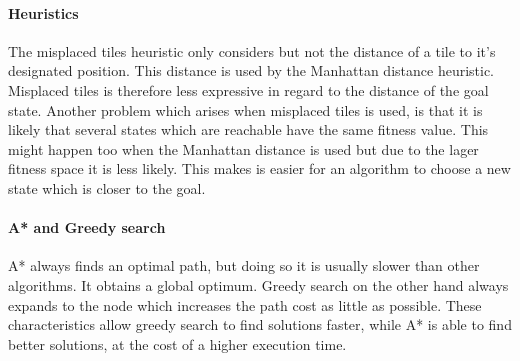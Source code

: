 \documentclass[a4paper,headsepline,12pt]{scrartcl}
\begin{document}
\paragraph{Heuristics}
The misplaced tiles heuristic only considers but not the distance of a tile to it's designated position. This distance is used by the Manhattan distance heuristic. Misplaced tiles is therefore less expressive in regard to the distance of the goal state. Another problem which arises when misplaced tiles is used, is that it is likely that several states which are reachable have the same fitness value. This might happen too when the Manhattan distance is used but due to the lager fitness space it is less likely. This makes is easier for an algorithm to choose a new state which is closer to the goal.  

\paragraph{A* and Greedy search}
A* always finds an optimal path, but doing so it is usually slower than other algorithms. It obtains a global optimum. Greedy search on the other hand always expands to the node which increases the path cost as little as possible. These characteristics allow greedy search to find solutions faster, while A* is able to find better solutions, at the cost of a higher execution time.
\end{document}
